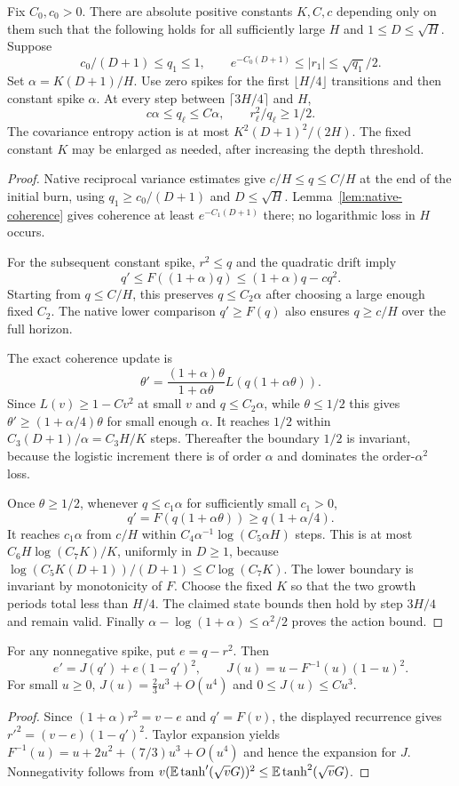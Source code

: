 \begin{lemma}
\label{lem:spike-prefix}
Fix $C_0,c_0>0$. There are absolute positive constants $K,C,c$ depending only on them such that the following holds for all sufficiently large $H$ and $1\le D\le\sqrt H$. Suppose
\[
 c_0/(D+1)\le q_1\le1,\qquad
 e^{-C_0(D+1)}\le|r_1|\le\sqrt{q_1}/2.
\]
Set $\alpha=K(D+1)/H$. Use zero spikes for the first $\lfloor H/4\rfloor$ transitions and then constant spike $\alpha$. At every step between $\lceil3H/4\rceil$ and $H$,
\[
 c\alpha\le q_\ell\le C\alpha,
 \qquad r_\ell^2/q_\ell\ge1/2.
\]
The covariance entropy action is at most $K^2(D+1)^2/(2H)$. The fixed constant $K$ may be enlarged as needed, after increasing the depth threshold.
\end{lemma}
\begin{proof}
Native reciprocal variance estimates give $c/H\le q\le C/H$ at the end of the initial burn, using $q_1\ge c_0/(D+1)$ and $D\le\sqrt H$. Lemma~\ref{lem:native-coherence} gives coherence at least $e^{-C_1(D+1)}$ there; no logarithmic loss in $H$ occurs.

For the subsequent constant spike, $r^2\le q$ and the quadratic drift imply
\[
 q'\le F((1+\alpha)q)\le(1+\alpha)q-cq^2.
\]
Starting from $q\le C/H$, this preserves $q\le C_2\alpha$ after choosing a large enough fixed $C_2$. The native lower comparison $q'\ge F(q)$ also ensures $q\ge c/H$ over the full horizon.

The exact coherence update is
\[
 \theta'=\frac{(1+\alpha)\theta}{1+\alpha\theta}
             L(q(1+\alpha\theta)).
\]
Since $L(v)\ge1-Cv^2$ at small $v$ and $q\le C_2\alpha$, while $\theta\le1/2$ this gives $\theta'\ge(1+\alpha/4)\theta$ for small enough $\alpha$. It reaches $1/2$ within $C_3(D+1)/\alpha=C_3H/K$ steps. Thereafter the boundary $1/2$ is invariant, because the logistic increment there is of order $\alpha$ and dominates the order-$\alpha^2$ loss.

Once $\theta\ge1/2$, whenever $q\le c_1\alpha$ for sufficiently small $c_1>0$,
\[
 q'=F(q(1+\alpha\theta))\ge q(1+\alpha/4).
\]
It reaches $c_1\alpha$ from $c/H$ within
$C_4\alpha^{-1}\log(C_5\alpha H)$ steps. This is at most
$C_6H\log(C_7K)/K$, uniformly in $D\ge1$, because
$\log(C_5K(D+1))/(D+1)\le C\log(C_7K)$.
The lower boundary is invariant by monotonicity of $F$. Choose the fixed $K$ so that the two growth periods total less than $H/4$. The claimed state bounds then hold by step $3H/4$ and remain valid. Finally $\alpha-\log(1+\alpha)\le\alpha^2/2$ proves the action bound.
\end{proof}

\begin{lemma}
\label{lem:spike-defect}
For any nonnegative spike, put $e=q-r^2$. Then
\[
 e'=J(q')+e(1-q')^2,
 \qquad J(u)=u-F^{-1}(u)(1-u)^2.
\]
For small $u\ge0$, $J(u)=\tfrac23u^3+O(u^4)$ and $0\le J(u)\le Cu^3$.
\end{lemma}
\begin{proof}
Since $(1+\alpha)r^2=v-e$ and $q'=F(v)$, the displayed recurrence gives $r'^2=(v-e)(1-q')^2$. Taylor expansion yields $F^{-1}(u)=u+2u^2+(7/3)u^3+O(u^4)$ and hence the expansion for $J$. Nonnegativity follows from $v(\mathbb E\tanh'(\sqrt vG))^2\le\mathbb E\tanh^2(\sqrt vG)$.
\end{proof}
